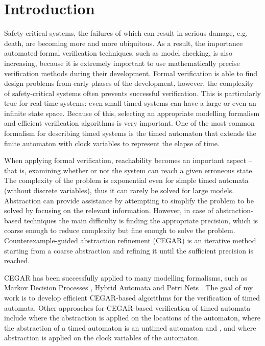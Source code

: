 \chapter{Introduction}
\label{chap:introduction}

Safety critical systems, the failures of which can result in serious damage, e.g. death, are becoming more and more ubiquitous. As a result, the importance automated formal verification techniques, such as model checking, is also increasing, because it is extremely important to use mathematically precise verification methods during their development. Formal verification is able to find design problems from early phases of the development, however, the complexity of safety-critical systems often prevents successful verification. This is particularly true for real-time systems: even small timed systems can have a large or even an infinite state space. Because of this, selecting an appropriate modelling formalism and efficient verification algorithms is very important. One of the most common formalism for describing timed systems is the timed automaton that extends the finite automaton with clock variables to represent the elapse of time.

When applying formal verification, reachability becomes an important aspect – that is, examining whether or not the system can reach a given erroneous state. The complexity of the problem is exponential even for simple timed automata (without discrete variables), thus it can rarely be solved for large models. Abstraction can provide assistance by attempting to simplify the problem to be solved by focusing on the relevant information. However, in case of abstraction-based techniques the main difficulty is finding the appropriate precision, which is coarse enough to reduce complexity but fine enough to solve the problem. Counterexample-guided abstraction refinement (CEGAR) is an iterative method starting from a coarse abstraction and refining it until the sufficient precision is reached.

CEGAR has been successfully applied to many modelling formalisms, such as Markov Decision Processes \cite{kwiatkowska2006game}, Hybrid Automata \cite{journals/fmsd/PrabhakarDM015} and Petri Nets \cite{journals/actaC/HajduVBM14}. The goal of my work is to develop efficient CEGAR-based algorithms for the verification of timed automata. Other approaches for CEGAR-based verification of timed automata include \cite{kemper2007sat} where the abstraction is applied on the locations of the automaton, \cite{nagaoka2010abstraction} where the abstraction of a timed automaton is an untimed
automaton and \cite{dierks2007automatic, he2010compositional}, and \cite{okano2011clock} where abstraction is applied on the clock variables of the automaton.

